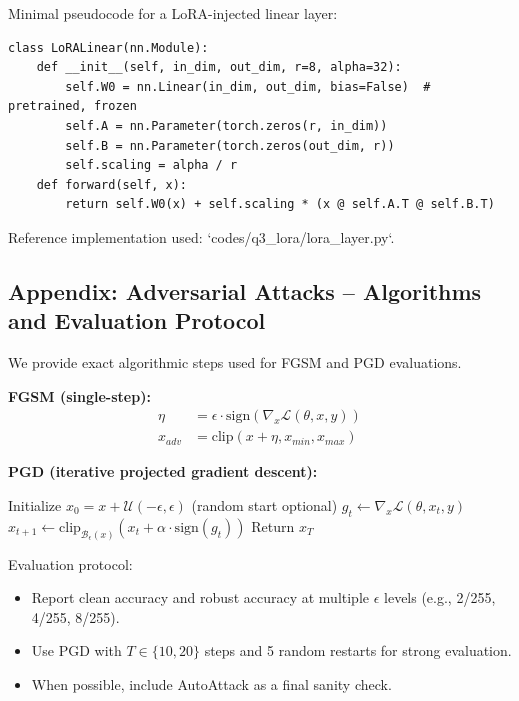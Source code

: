 \documentclass[conference]{IEEEtran}
\begin{document}
Minimal pseudocode for a LoRA-injected linear layer:
\begin{lstlisting}
class LoRALinear(nn.Module):
    def __init__(self, in_dim, out_dim, r=8, alpha=32):
        self.W0 = nn.Linear(in_dim, out_dim, bias=False)  # pretrained, frozen
        self.A = nn.Parameter(torch.zeros(r, in_dim))
        self.B = nn.Parameter(torch.zeros(out_dim, r))
        self.scaling = alpha / r
    def forward(self, x):
        return self.W0(x) + self.scaling * (x @ self.A.T @ self.B.T)
\end{lstlisting}
Reference implementation used: `codes/q3_lora/lora_layer.py`.

\subsection{Appendix: Adversarial Attacks -- Algorithms and Evaluation Protocol}\label{appendix:adv}
We provide exact algorithmic steps used for FGSM and PGD evaluations.

\textbf{FGSM (single-step):}
\begin{align}
\eta &= \epsilon \cdot \text{sign}(\nabla_x \mathcal{L}(\theta, x, y)) \\
x_{adv} &= \text{clip}(x + \eta, x_{min}, x_{max})
\end{align}

\textbf{PGD (iterative projected gradient descent):}
\begin{algorithmic}[1]
\State Initialize \(x_0 = x + \mathcal{U}(-\epsilon,\epsilon)\) (random start optional)
  \State \(g_t \leftarrow \nabla_x \mathcal{L}(\theta, x_t, y)\)
  \State \(x_{t+1} \leftarrow \text{clip}_{\mathcal{B}_\epsilon(x)}(x_t + \alpha \cdot \text{sign}(g_t))\)
\EndFor
\State Return \(x_T\)
\end{algorithmic}

Evaluation protocol:
\begin{itemize}
  \item Report clean accuracy and robust accuracy at multiple \(\epsilon\) levels (e.g., {2/255, 4/255, 8/255}).
  \item Use PGD with \(T\in\{10,20\}\) steps and 5 random restarts for strong evaluation.
  \item When possible, include AutoAttack as a final sanity check.
\end{itemize}
\end{document}
